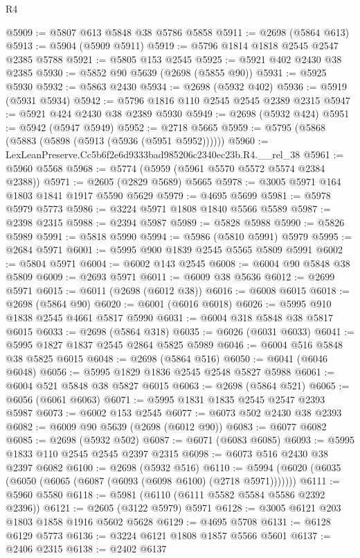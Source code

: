 \begin{lexlean}{R4}
\begin{coremodule}
@5909 := @5807 @613 @5848 @38 @5786 @5858
@5911 := @2698 (@5864 @613)
@5913 := @5904 (@5909 @5911)
@5919 := @5796 @1814 @1818 @2545 @2547 @2385 @5788
@5921 := @5805 @153 @2545
@5925 := @5921 @402 @2430 @38 @2385
@5930 := @5852 @90 @5639 (@2698 (@5855 @90))
@5931 := @5925 @5930
@5932 := @5863 @2430
@5934 := @2698 (@5932 @402)
@5936 := @5919 (@5931 @5934)
@5942 := @5796 @1816 @110 @2545 @2545 @2389 @2315
@5947 := @5921 @424 @2430 @38 @2389 @5930
@5949 := @2698 (@5932 @424)
@5951 := @5942 (@5947 @5949)
@5952 := @2718 @5665
@5959 := @5795 (@5868 (@5883 (@5898 (@5913 (@5936 (@5951 @5952))))))
@5960 := LexLeanPreserve.Cc5b6f2e6d9333bad985206c2340ec23b.R4.__rel_38
@5961 := @5960 @5568
@5968 := @5774 (@5959 (@5961 @5570 @5572 @5574 @2384 @2388))
@5971 := @2605 (@2829 @5689) @5665
@5978 := @3005 @5971 @164 @1803 @1841 @1917 @5590 @5629
@5979 := @4695 @5699
@5981 := @5978 @5979 @5773
@5986 := @3224 @5971 @1808 @1840 @5566 @5589
@5987 := @2398 @2315
@5988 := @2394 @5987
@5989 := @5828 @5988
@5990 := @5826 @5989
@5991 := @5818 @5990
@5994 := @5986 (@5810 @5991) @5979
@5995 := @2684 @5971
@6001 := @5995 @900 @1839 @2545 @5565 @5809 @5991
@6002 := @5804 @5971
@6004 := @6002 @143 @2545
@6008 := @6004 @90 @5848 @38 @5809
@6009 := @2693 @5971
@6011 := @6009 @38 @5636
@6012 := @2699 @5971
@6015 := @6011 (@2698 (@6012 @38))
@6016 := @6008 @6015
@6018 := @2698 (@5864 @90)
@6020 := @6001 (@6016 @6018)
@6026 := @5995 @910 @1838 @2545 @4661 @5817 @5990
@6031 := @6004 @318 @5848 @38 @5817 @6015
@6033 := @2698 (@5864 @318)
@6035 := @6026 (@6031 @6033)
@6041 := @5995 @1827 @1837 @2545 @2864 @5825 @5989
@6046 := @6004 @516 @5848 @38 @5825 @6015
@6048 := @2698 (@5864 @516)
@6050 := @6041 (@6046 @6048)
@6056 := @5995 @1829 @1836 @2545 @2548 @5827 @5988
@6061 := @6004 @521 @5848 @38 @5827 @6015
@6063 := @2698 (@5864 @521)
@6065 := @6056 (@6061 @6063)
@6071 := @5995 @1831 @1835 @2545 @2547 @2393 @5987
@6073 := @6002 @153 @2545
@6077 := @6073 @502 @2430 @38 @2393
@6082 := @6009 @90 @5639 (@2698 (@6012 @90))
@6083 := @6077 @6082
@6085 := @2698 (@5932 @502)
@6087 := @6071 (@6083 @6085)
@6093 := @5995 @1833 @110 @2545 @2545 @2397 @2315
@6098 := @6073 @516 @2430 @38 @2397 @6082
@6100 := @2698 (@5932 @516)
@6110 := @5994 (@6020 (@6035 (@6050 (@6065 (@6087 (@6093 (@6098 @6100) (@2718 @5971)))))))
@6111 := @5960 @5580
@6118 := @5981 (@6110 (@6111 @5582 @5584 @5586 @2392 @2396))
@6121 := @2605 (@3122 @5979) @5971
@6128 := @3005 @6121 @203 @1803 @1858 @1916 @5602 @5628
@6129 := @4695 @5708
@6131 := @6128 @6129 @5773
@6136 := @3224 @6121 @1808 @1857 @5566 @5601
@6137 := @2406 @2315
@6138 := @2402 @6137

\end{coremodule}
\end{lexlean}
